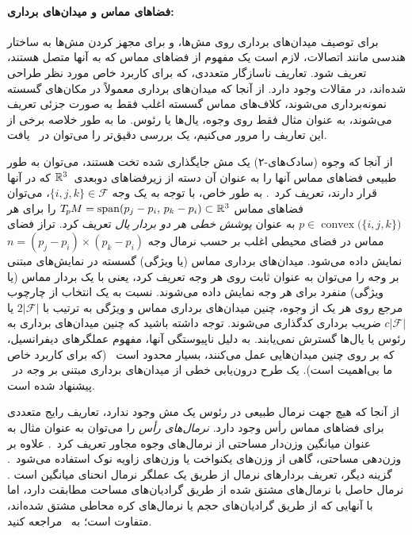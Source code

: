 \paragraph{فضاهای مماس و میدان‌های برداری:}
برای توصیف میدان‌های برداری روی مش‌ها، و برای مجهز کردن مش‌ها به ساختار هندسی مانند اتصالات، لازم است یک مفهوم از فضاهای مماس که به آنها متصل هستند، تعریف شود.
تعاریف ناسازگار متعددی، که برای کاربرد خاص مورد نظر طراحی شده‌اند، در مقالات وجود دارد.
از آنجا که میدان‌های برداری معمولاً در مکان‌های گسسته نمونه‌برداری می‌شوند، کلاف‌های مماس گسسته اغلب فقط به صورت جزئی تعریف می‌شوند، به عنوان مثال فقط روی وجوه، یال‌ها یا رئوس.
ما به طور خلاصه برخی از این تعاریف را مرور می‌کنیم، یک بررسی دقیق‌تر را می‌توان در~\cite{deGoes2016VectorFieldProcessing} یافت.


از آنجا که وجوه (سادک‌های-۲) یک مش جایگذاری شده تخت هستند، می‌توان به طور طبیعی فضاهای مماس آنها را به عنوان آن دسته از زیرفضاهای دوبعدی~$\mathbb{R}^3$ که در آنها قرار دارند، تعریف کرد~\cite{craneTrivialConnectionsDiscrete2010,craneDiscreteDifferentialGeometry2014,wang2012surfaceReconstruction}.
به طور خاص، با توجه به یک وجه $\{i,j,k\} \in \mathcal{F}$، می‌توان فضاهای مماس $T_{\mkern-1.5mu p}\mkern-.5muM = \operatorname{span}(p_j-p_i,\, p_k-p_i) \subset \mathbb{R}^3$ را برای هر $p\in \operatorname{convex}\!\big(\{i,j,k\}\big)$ به عنوان \emph{پوشش خطی هر دو بردار یال} تعریف کرد.
تراز فضای مماس در فضای محیطی اغلب بر حسب نرمال وجه $n = (p_j-p_i) \times (p_k-p_i)$ نمایش داده می‌شود.
میدان‌های برداری مماس (یا ویژگی) گسسته در نمایش‌های مبتنی بر وجه را می‌توان به عنوان ثابت روی هر وجه تعریف کرد، یعنی با یک بردار مماس (یا ویژگی) منفرد برای هر وجه نمایش داده می‌شوند.
نسبت به یک انتخاب از چارچوب مرجع روی هر یک از وجوه، چنین میدان‌های برداری مماس و ویژگی به ترتیب با $2|\mathcal{F}|$ یا $c|\mathcal{F}|$ ضریب برداری کدگذاری می‌شوند.
توجه داشته باشید که چنین میدان‌های برداری به رئوس یا یال‌ها گسترش نمی‌یابند.
به دلیل ناپیوستگی آنها، مفهوم عملگرهای دیفرانسیل، که بر روی چنین میدان‌هایی عمل می‌کنند، بسیار محدود است~\cite{deGoes2016VectorFieldProcessing} (که برای کاربرد خاص ما بی‌اهمیت است).
یک طرح درون‌یابی خطی از میدان‌های برداری مبتنی بر وجه در~\cite{li2006representing} پیشنهاد شده است.


از آنجا که هیچ جهت نرمال طبیعی در رئوس یک مش وجود ندارد، تعاریف رایج متعددی برای فضاهای مماس رأس وجود دارد.
\emph{نرمال‌های رأس} را می‌توان به عنوان مثال به عنوان میانگین وزن‌دار مساحتی از نرمال‌های وجوه مجاور تعریف کرد~\cite{lipman2005linear,lai2009metric,deHaan2020meshCNNs}.
علاوه بر وزن‌دهی مساحتی، گاهی از وزن‌های یکنواخت یا وزن‌های زاویه نوک استفاده می‌شود~\cite{craneDiscreteDifferentialGeometry2014}.
گزینه دیگر، تعریف بردارهای نرمال از طریق یک عملگر نرمال انحنای میانگین است \cite{meyer2003discrete}.
نرمال حاصل با نرمال‌های مشتق شده از طریق گرادیان‌های مساحت مطابقت دارد، اما با آنهایی که از طریق گرادیان‌های حجم یا نرمال‌های کره محاطی مشتق شده‌اند، متفاوت است؛ به~\cite{craneDiscreteDifferentialGeometry2014} مراجعه کنید.


